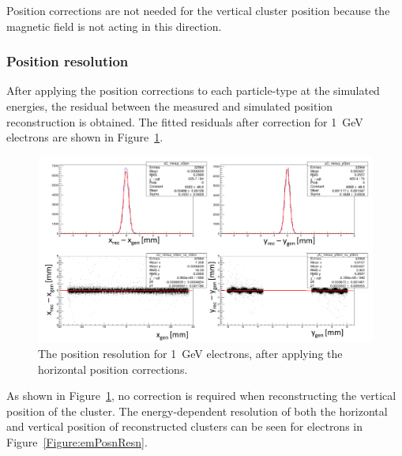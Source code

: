 Position corrections are not needed for the vertical cluster position because the magnetic field is not acting in this direction. 

\subsubsection{Position resolution}

After applying the position corrections to each particle-type at the simulated energies, the residual between the measured and simulated position reconstruction is obtained. The fitted residuals after correction for 1~GeV electrons are shown in Figure~\ref{Figure:corrPosnsFits}.

\begin{figure}[H]
  \centering
      \includegraphics[width=1.0\textwidth]{pics/performance/corrPosnsFits.png}
  \caption[Position resolution for 1~GeV electrons.]{The position resolution for 1~GeV electrons, after applying the horizontal position corrections.}
  \label{Figure:corrPosnsFits}
\end{figure}

As shown in Figure~\ref{Figure:corrPosnsFits}, no correction is required when reconstructing the vertical position of the cluster. The energy-dependent resolution of both the horizontal and vertical position of reconstructed clusters can be seen for electrons in Figure~\ref{Figure:emPosnResn}. 

